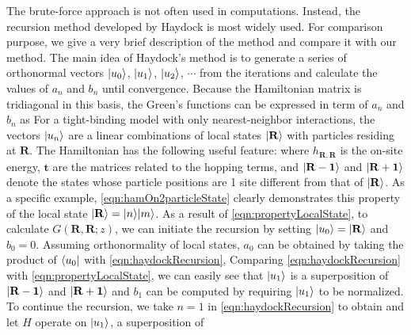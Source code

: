 The brute-force approach is not often used in computations. Instead, the recursion method developed by Haydock 
\cite{haydock1972, haydock1975} is most widely used. For comparison purpose, we give a very brief description of the
method and compare it with our method.  The main idea of Haydock's method is to generate a series of orthonormal
vectors $| u_0 \rangle$, $| u_1 \rangle$, $| u_2 \rangle$, $\cdots$ from the iterations
and calculate the values of $a_n$ and $b_n$ until convergence. 
Because the Hamiltonian matrix is tridiagonal in this basis, the Green's functions can be expressed in 
term of $a_n$ and $b_n$ as
For a tight-binding model with only nearest-neighbor 
interactions, the vectors $| u_n \rangle$ are a linear combinations of local states $| \mathbf{R} \rangle$ with particles residing at 
$\mathbf{R}$. The Hamiltonian has the following useful feature:
where $h_{\mathbf{R}, \mathbf{R}}$ is the on-site energy, $\mathbf{t}$ are the matrices related to the hopping terms, and 
$|  \mathbf{R-1} \rangle$ and $|  \mathbf{R+1} \rangle$ denote the states whose particle 
positions are 1 site  different from that of $|  \mathbf{R} \rangle$. As a specific example, 
\autoref{eqn:hamOn2particleState} clearly demonstrates this property of the local state $|  \mathbf{R} \rangle = 
| n \rangle| m \rangle$. As a result of \autoref{eqn:propertyLocalState}, to calculate $G(\mathbf{R}, \mathbf{R}; z)$, 
we can initiate the recursion by setting $| u_0 \rangle = | \mathbf{R} \rangle$ and $b_0 = 0$. Assuming orthonormality of 
local states, $a_0$ can be obtained by taking the product of $\langle u_0 |$ with \autoref{eqn:haydockRecursion},
Comparing \autoref{eqn:haydockRecursion} with \autoref{eqn:propertyLocalState}, we can easily see that 
 $| u_1 \rangle$ is a superposition of $|  \mathbf{R-1} \rangle$ and $|  \mathbf{R+1} \rangle$ and $b_1$ can be 
computed by requiring $| u_1 \rangle$ to be normalized. To continue the recursion, we take
$n=1$ in \autoref{eqn:haydockRecursion} to obtain
and let $H$ operate on $| u_1 \rangle$, a superposition of  
